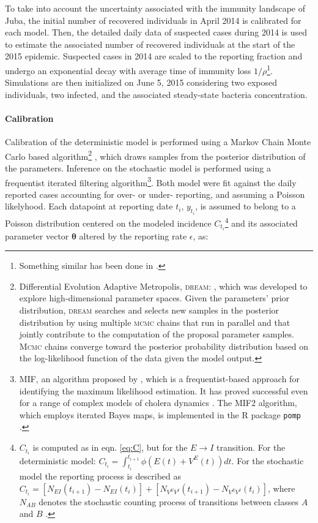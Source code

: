  
 To take into account the uncertainty associated with the immunity landscape of Juba, the initial number of recovered individuals in April 2014 is calibrated for each model. Then, the detailed daily data of suspected cases during 2014 is used to estimate the associated number of recovered individuals at the start of the 2015 epidemic. Suspected cases in 2014 are scaled to the reporting fraction and  undergo an exponential decay with average time of immunity loss $1/\rho$\footnote{Something similar has been done in \parencite{Pasetto:RealtimeProjectionsCholera:2017}.}. Simulations are then initialized on June 5, 2015 considering two exposed individuals, two infected, and the associated steady-state bacteria concentration. 
 
\paragraph{Calibration} Calibration of the deterministic model is performed using a Markov Chain Monte Carlo based algorithm\footnote{Differential Evolution Adaptive Metropolis, \textsc{dream}: \parencite{Vrugt:MarkovChainMonte:2016}, which was developed to explore high-dimensional parameter spaces. Given the parameters' prior distribution, \textsc{dream} searches and selects new samples in the posterior distribution by using multiple \textsc{mcmc} chains that run in parallel and that jointly contribute to the computation of the proposal parameter samples. \textsc{Mcmc} chains  converge toward the posterior probability distribution based on the log-likelihood function of the data given the model output.} , which draws samples from the posterior distribution of the parameters.
Inference on the stochastic model is performed using a frequentist iterated filtering algorithm\footnote{MIF, an algorithm proposed by \parencite{Ionides:InferenceDynamicLatent:2015}, which is a frequentist-based approach for identifying the maximum likelihood estimation. It has proved successful even for a range of complex models of cholera dynamics \parencite{King:InapparentInfectionsCholera:2008,Baracchini:SeasonalityCholeraDynamics:2017}. The MIF2 algorithm, which employs iterated Bayes maps, is implemented in the R package \texttt{pomp} \parencite{King:StatisticalInferencePartially:2015}. %
}. Both model were fit against the daily reported cases accounting for over- or under- reporting, and assuming a Poisson likelyhood. Each datapoint at reporting date $t_i$,  $y_{t_i}$, is assumed to belong to a Poisson distribution centered on the modeled incidence $C_{t_i}$\footnote{$C_{t_i}$ is computed as in  eqn. \eqref{eq:C}, but for the $E \rightarrow I$ transition. For the deterministic model: $ C_{t_i} = \int_{t_i}^{t_{i+1}} \phi \left(E(t) + V^E(t)\right) dt$. For the stochastic model the reporting process is described %
as $ C_{t_i} = [N_{EI}(t_{i+1}) - N_{EI}(t_i)] + [N_{V^EV^I}(t_{i+1}) - N_{V^EV^I}(t_i)] $, where $N_{AB}$ denotes the stochastic counting process of transitions between classes $A$ and $B$ .
} and its associated parameter vector $\boldsymbol{\theta}$ altered by the reporting rate $\epsilon$, as:
